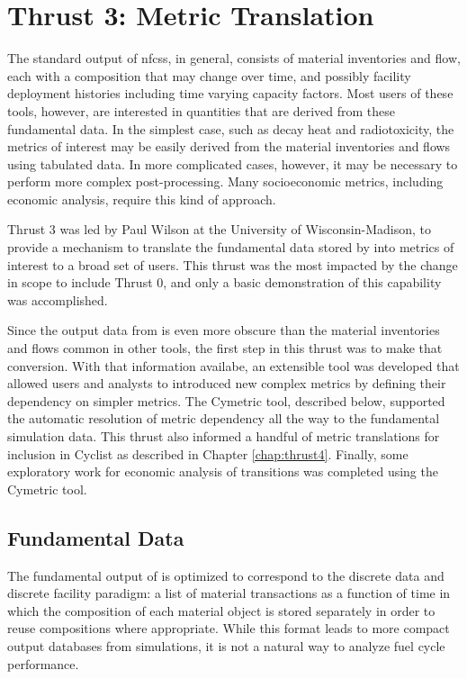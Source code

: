 \chapter{Thrust 3: Metric Translation}\label{chap:thrust3}

The standard output of \glspl{nfcs}, in general, consists of material
inventories and flow, each with a composition that may change over time, and
possibly facility deployment histories including time varying capacity
factors.  Most users of these tools, however, are interested in quantities
that are derived from these fundamental data.  In the simplest case, such as
decay heat and radiotoxicity, the metrics of interest may be easily derived
from the material inventories and flows using tabulated data.  In more
complicated cases, however, it may be necessary to perform more complex
post-processing.  Many socioeconomic metrics, including economic analysis,
require this kind of approach.

Thrust 3 was led by Paul Wilson at the University of Wisconsin-Madison, to
provide a mechanism to translate the fundamental data stored by \Cyclus into
metrics of interest to a broad set of users.  This thrust was the most
impacted by the change in scope to include Thrust 0, and only a basic
demonstration of this capability was accomplished.

Since the output data from \Cyclus is even more obscure than the material
inventories and flows common in other tools, the first step in this thrust was
to make that conversion.  With that information availabe, an extensible tool
was developed that allowed users and analysts to introduced new complex
metrics by defining their dependency on simpler metrics.  The Cymetric tool,
described below, supported the automatic resolution of metric dependency all
the way to the fundamental simulation data.  This thrust also informed a
handful of metric translations for inclusion in Cyclist as described in
Chapter \ref{chap:thrust4}.  Finally, some exploratory work for economic
analysis of transitions was completed using the Cymetric tool.

\section{Fundamental Data}

The fundamental output of \Cyclus is optimized to correspond to the discrete
data and discrete facility paradigm: a list of material transactions as a
function of time in which the composition of each material object is stored
separately in order to reuse compositions where appropriate.  While this
format leads to more compact output databases from \Cyclus simulations, it is
not a natural way to analyze fuel cycle performance.

